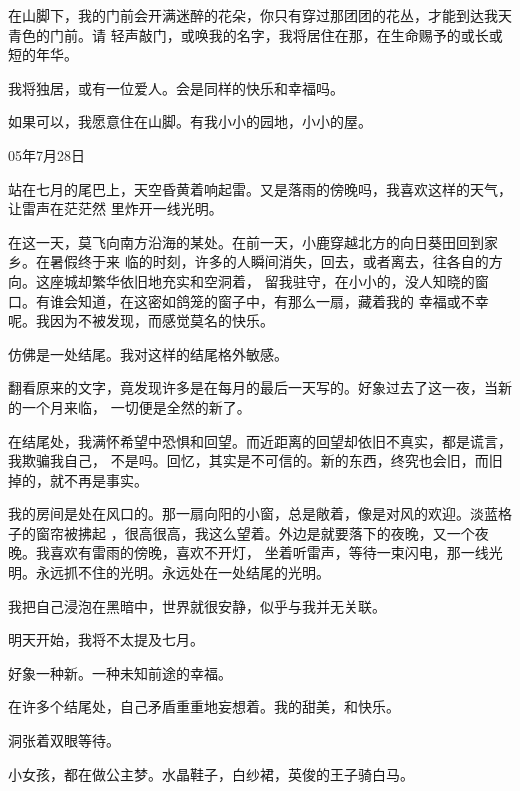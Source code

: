 \documentclass[12pt,a4paper]{article}
\begin{document}
		在山脚下，我的门前会开满迷醉的花朵，你只有穿过那团团的花丛，才能到达我天青色的门前。请
	轻声敲门，或唤我的名字，我将居住在那，在生命赐予的或长或短的年华。

		我将独居，或有一位爱人。会是同样的快乐和幸福吗。

		如果可以，我愿意住在山脚。有我小小的园地，小小的屋。

		\begin{flushright}
			05年7月28日
		\end{flushright}

	\endwriting



		站在七月的尾巴上，天空昏黄着响起雷。又是落雨的傍晚吗，我喜欢这样的天气，让雷声在茫茫然
	里炸开一线光明。

		在这一天，莫飞向南方沿海的某处。在前一天，小鹿穿越北方的向日葵田回到家乡。在暑假终于来
	临的时刻，许多的人瞬间消失，回去，或者离去，往各自的方向。这座城却繁华依旧地充实和空洞着，
	留我驻守，在小小的，没人知晓的窗口。有谁会知道，在这密如鸽笼的窗子中，有那么一扇，藏着我的
	幸福或不幸呢。我因为不被发现，而感觉莫名的快乐。

		仿佛是一处结尾。我对这样的结尾格外敏感。

		翻看原来的文字，竟发现许多是在每月的最后一天写的。好象过去了这一夜，当新的一个月来临，
	一切便是全然的新了。

		在结尾处，我满怀希望中恐惧和回望。而近距离的回望却依旧不真实，都是谎言，我欺骗我自己，
	不是吗。回忆，其实是不可信的。新的东西，终究也会旧，而旧掉的，就不再是事实。

		我的房间是处在风口的。那一扇向阳的小窗，总是敞着，像是对风的欢迎。淡蓝格子的窗帘被拂起
	，很高很高，我这么望着。外边是就要落下的夜晚，又一个夜晚。我喜欢有雷雨的傍晚，喜欢不开灯，
	坐着听雷声，等待一束闪电，那一线光明。永远抓不住的光明。永远处在一处结尾的光明。

		我把自己浸泡在黑暗中，世界就很安静，似乎与我并无关联。\par
		明天开始，我将不太提及七月。\par
		好象一种新。一种未知前途的幸福。\par
		在许多个结尾处，自己矛盾重重地妄想着。我的甜美，和快乐。\par
		洞张着双眼等待。

	\endwriting



		小女孩，都在做公主梦。水晶鞋子，白纱裙，英俊的王子骑白马。
\end{document}
